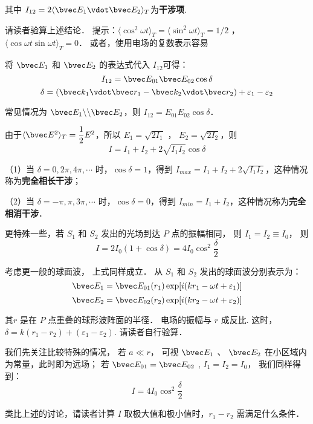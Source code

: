 其中 $ I _{12} =2 \langle \bvec E_1 \vdot \bvec E_2 \rangle _T$为\textbf{干涉项}.

\begin{exercise}{}
请读者验算上述结论． 提示：$\langle \cos ^2 \omega t \rangle _T = \langle \sin ^2 \omega t \rangle _T = 1/2 $ ， $ \langle \cos \omega t \sin \omega t \rangle_T =0 $． 或者，使用电场的复数表示容易
\end{exercise}

将 $\bvec E_1$ 和 $ \bvec E_2$ 的表达式代入 $I_{12}$可得：
$$I_{12} = \bvec E_{01}\bvec E_{02} \cos\delta$$
$$\delta = (\bvec k_1 \vdot \bvec r_1 - \bvec k_2 \vdot \bvec r_2 ) + \varepsilon_1 - \varepsilon_2 $$

常见情况为 $\bvec E_1 \backslash\backslash\bvec E_2$，则 $ I_{12} = E_{01} E_{02}\cos\delta$．

由于$\langle \bvec E^2 \rangle _T = \dfrac{1}{2}E^2$，所以 $ E_1 = \sqrt{2I_1}$ ，  $ E_2 = \sqrt{2I_2}$，则
$$  I = I_1 + I_2 + 2\sqrt{I_1 I_2}\cos\delta$$

（1）当 $\delta = 0, 2\pi, 4\pi, \cdots$ 时，$\cos \delta = 1$，得到 $ I_{max} = I_1 + I_2 +2\sqrt{I_1 I_2}$，这种情况称为\textbf{完全相长干涉}；

（2）当 $\delta = -\pi, \pi, 3\pi, \cdots$ 时，$\cos \delta = 0$，得到 $ I_{min} = I_1 + I_2 $，这种情况称为\textbf{完全相消干涉}．

更特殊一些，若 $S_1$ 和 $S_2$ 发出的光场到达 $ P $ 点的振幅相同， 则 $ I_1 = I_2 \equiv I_0$， 则
$$ I = 2 I_0 ( 1 + \cos\delta ) = 4 I_0 \cos ^2\dfrac { \delta } { 2 } $$

考虑更一般的球面波， 上式同样成立． 从 $ S_1 $ 和 $ S_2 $ 发出的球面波分别表示为：
$$ \bvec E_1 = \bvec E_{ 01 } ( r_1 ) \exp[ i( k r_1 - \omega t+ \varepsilon_1 )]$$
$$ \bvec E_2 = \bvec E_{ 02 } ( r_2 ) \exp[ i( k r_2 - \omega t+ \varepsilon_2 )]$$

其$ r $ 是在 $ P $ 点重叠的球形波阵面的半径． 电场的振幅与 $ r $ 成反比. 这时， $ \delta = k ( r_1 - r_2 ) + ( \varepsilon_1 - \varepsilon_2 )$.  请读者自行验算．

我们先关注比较特殊的情况， 若 $ a \ll r $， 可视 $ \bvec E_1$ 、 $ \bvec E_2$ 在小区域内为常量，此时即为远场； 若 $ \bvec E_{01} = \bvec E_{02} $ , $ I_1 = I_2 = I_0 $， 我们同样得到：
$$ I = 4 I_0 \cos ^2\dfrac { \delta } { 2 }$$

\begin{exercise}{}
类比上述的讨论，请读者计算 $ I $ 取极大值和极小值时，$ r_1 - r_2 $ 需满足什么条件．
\end{exercise}




